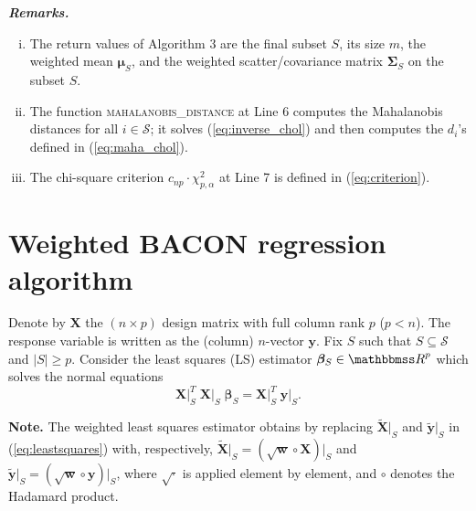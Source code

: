 \documentclass[a4paper,oneside,11pt,DIV=12]{scrartcl}
\newcommand{\R}{{\mathbbmss R}}
\begin{document}
\vspace{1em}
\noindent\textbf{\sffamily \small \itshape Remarks.}
\vspace{-0.5em}
\begin{enumerate}[i)]
	\item The return values of Algorithm 3 are the final subset $S$,
		its size $m$, the weighted mean $\bm \mu_S$, and the weighted
		scatter/covariance matrix $\bm \Sigma_S$ on the subset $S$.
	\item The function \textsc{mahalanobis\_distance} at Line 6 computes
		the Mahalanobis distances for all $i \in \mathscr{S}$; it
		solves (\ref{eq:inverse_chol}) and then computes the $d_i$'s
		defined in  (\ref{eq:maha_chol}).
	\item The chi-square criterion $c_{np}\cdot \chi_{p,\alpha}^2$ at
		Line 7 is defined in (\ref{eq:criterion}).
\end{enumerate}


\section{Weighted BACON regression algorithm}\label{sec:wbaconreg}
Denote by $\bm X$ the $(n \times p)$ design matrix with full column rank
$p$ ($p < n$). The response variable is written as the (column) $n$-vector
$\bm y$. Fix $S$ such that $S \subseteq \mathscr{S}$ and
$\vert S \vert \geq p$. Consider the least squares (LS) estimator
$\bm \beta_S \in \R^p$ which solves the normal equations
\begin{equation}\label{eq:leastsquares}
	\bm X \vert_{S}^T \; \bm X \vert_{S} \; \bm \beta_S =
		\bm X \vert_S^T \;\bm y \vert_{S}.
\end{equation}

\textbf{\sffamily Note.} The weighted least squares estimator obtains by
replacing $\widetilde{\bm X} \vert_S$ and $\widetilde{\bm y} \vert_S$ in
(\ref{eq:leastsquares}) with, respectively,
$\widetilde{\bm X}\vert_S = (\sqrt{\bm w} \circ \bm X)\vert_S$ and
$\widetilde{\bm y}\vert_S = (\sqrt{\bm w} \circ \bm y)\vert_S$, where
$\sqrt{\cdot}$ is applied element by element, and $\circ$ denotes the
Hadamard product.
\end{document}
